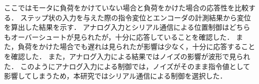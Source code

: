 \documentclass[a4paper,12pt]{article_vdlab_sotsuron}
\begin{document}
\newpage
ここではモータに負荷をかけていない場合と負荷をかけた場合の応答性を比較する．
ステップ状の入力を与えた際の指令変位とエンコーダの計測結果から変位を算出した結果を示す．
アナログ入力とシリアル通信による位置制御はどちらもオーバーシュートが見られたが，十分に応答していることを確認した．
また，負荷をかけた場合でも遅れは見られたが影響は少なく，十分に応答することを確認した．
また，アナログ入力による結果ではノイズの影響が波形で見られた．
このようにアナログ入力による制御では，ノイズがそのまま指令値として影響してしまうため，本研究ではシリアル通信による制御を選択した．

%
\end{document}
